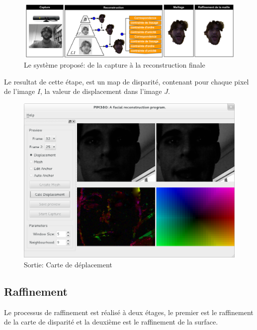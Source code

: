 \documentclass[a4paper,12pt]{article}
\begin{document}
\begin{figure}[ht!]
  \begin{center}
    \includegraphics[scale=0.35]{img/projSystem.png}
    \caption{Le système proposé: de la capture à la reconstruction finale}
  \end{center}
\end{figure}

Le resultat de cette étape, est un map de disparité, contenant pour
chaque pixel de l'image $I$, la valeur de displacement dans l'image
$J$. 

\begin{figure}[ht!]
  \begin{center}
    \includegraphics[scale=0.4]{img/dispMap.png}
    \caption{Sortie: Carte de déplacement}
  \end{center}
\end{figure}


\newpage
\subsection{Raffinement}

Le processus de raffinement est réalisé à deux étages, le premier est le
raffinement de la carte de disparité et la deuxième est le raffinement
de la surface.  
\end{document}
